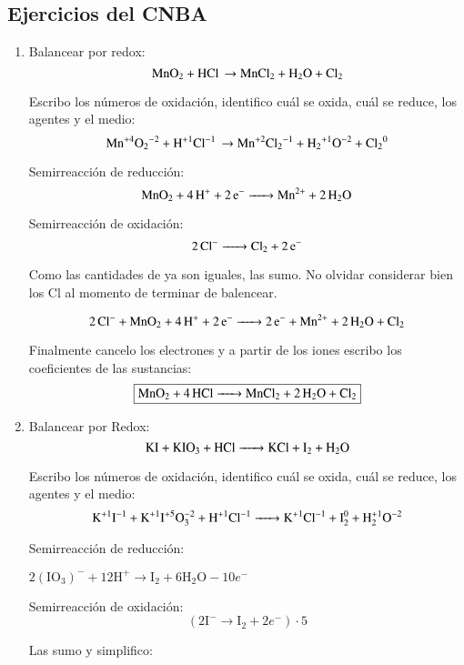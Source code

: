 \subsection{Ejercicios del CNBA}

\begin{enumerate}
\item Balancear por redox:
$$\ce{MnO_2 + HCl \rightarrow MnCl_2 + H_2O + Cl_2}$$

Escribo los números de oxidación, identifico cuál se oxida, cuál se reduce, los agentes y el medio:
$$\ce{Mn^{+4}O_2^{-2} + H^{+1}Cl^{-1} \rightarrow Mn^{+2}Cl_2^{-1} + H_2^{+1}O^{-2} + Cl_2^{0}}$$


\begin{multicols}{2}
    Semirreacción de reducción:
    $$\ce{MnO_2 + 4 H^+ + 2e^- ->
    Mn^{2+} + 2H_2O}$$

    Semirreacción de oxidación:
    $$\ce{2Cl^- ->
    Cl_2 + 2e^-}$$
\end{multicols}

Como las cantidades de  ya son iguales, las sumo. No olvidar considerar bien los Cl al momento de terminar de balencear.

$$\ce{2 Cl^- + MnO_2 + 4H^+ + 2e^- -> 2e^- + Mn^{2+} + 2H_2O + Cl_2}$$

Finalmente cancelo los electrones y a partir de los iones escribo los coeficientes de las sustancias:
$$\fbox{\ce{MnO_2 + 4HCl -> MnCl_2 + 2H_2O + Cl_2}}$$


\item Balancear por Redox:
$$\ce{
KI + KIO3 + HCl ->
KCl + I2 + H2O
}$$

Escribo los números de oxidación, identifico cuál se oxida, cuál se reduce, los agentes y el medio: 
$$\ce{
K^{+1}I^{-1} + K^{+1}I^{+5}O^{-2}3 + H^{+1}Cl^{-1} ->
K^{+1}Cl^{-1} + I^{0}2 + H^{+1}2O^{-2}
}$$


\begin{multicols}{2}
Semirreacción de reducción:

\hfil$2(\text{IO}_3)^{-} + 12 \text{H}^+ \longrightarrow \text{I}_2 + 6\text{H}_2 \text{O} - 10e^-$\hfil

Semirreacción de oxidación:
$$\left(2\text{I}^{-} \longrightarrow \text{I}_2 + 2e^-\right)\cdot 5$$
\end{multicols}

Las sumo y simplifico:


\end{enumerate}
